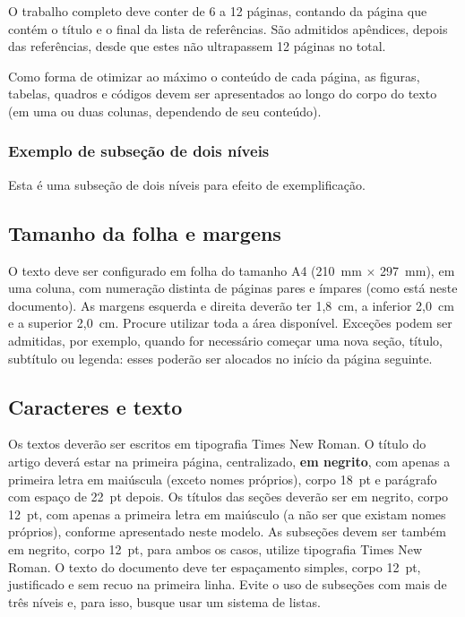 O trabalho completo deve conter de 6 a 12 páginas, contando da  página que contém o título e o final da lista de referências. São admitidos apêndices, depois das referências, desde que estes não ultrapassem 12 páginas no total. 

Como forma de otimizar ao máximo o conteúdo de cada página, as figuras, tabelas, quadros e códigos devem ser apresentados ao longo do corpo do texto (em uma ou duas colunas, dependendo de seu conteúdo).

\subsubsection{Exemplo de subseção de dois níveis}

Esta é uma subseção de dois níveis para efeito de exemplificação.

\subsection{Tamanho da folha e margens}

O texto deve ser configurado em folha do tamanho A4 (210~mm $\times$ 297~mm), em uma coluna, com numeração distinta de páginas pares e ímpares (como está neste documento). As margens esquerda e direita deverão ter 1,8~cm, a inferior 2,0~cm e a superior 2,0~cm. Procure utilizar toda a área disponível. Exceções podem ser admitidas, por exemplo, quando for necessário começar uma nova seção, título, subtítulo ou legenda: esses poderão ser alocados no início da página seguinte.

\subsection{Caracteres e texto}

Os textos deverão ser escritos em tipografia Times New Roman. O título do artigo deverá estar na primeira página, centralizado, \textbf{em negrito}, com apenas a primeira letra em maiúscula (exceto nomes próprios), corpo 18~pt e parágrafo com espaço de 22~pt depois. Os títulos das seções deverão ser em negrito, corpo 12~pt, com apenas a primeira letra em maiúsculo (a não ser que existam nomes próprios), conforme apresentado neste modelo. As subseções devem ser também em negrito, corpo 12~pt, para ambos os casos, utilize tipografia Times New Roman. O texto do documento deve ter espaçamento simples, corpo 12~pt, justificado e sem recuo na primeira linha. Evite o uso de subseções com mais de três níveis e, para isso, busque usar um sistema de listas. 

